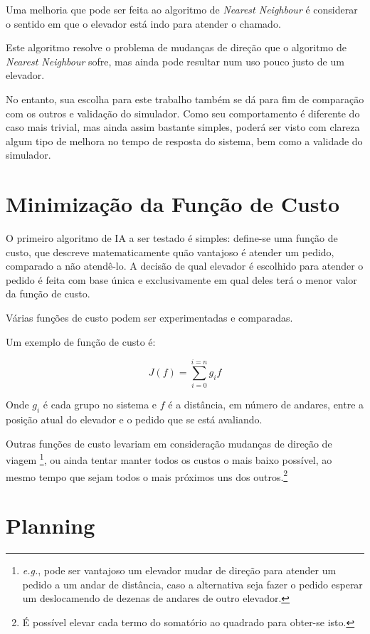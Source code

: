 Uma melhoria que pode ser feita ao algoritmo de \textit{Nearest Neighbour}
é considerar o sentido em que o elevador está indo para atender o chamado.

Este algoritmo resolve o problema de mudanças de direção que o algoritmo de
\textit{Nearest Neighbour} sofre, mas ainda pode resultar num uso pouco justo de
um elevador. %

No entanto, sua escolha para este trabalho também se dá para fim de comparação
com os outros e validação do simulador. Como seu comportamento é diferente do
caso mais trivial, mas ainda assim bastante simples, poderá ser visto com clareza
algum tipo de melhora no tempo de resposta do sistema, bem como a validade do simulador.

\section{\label{sec:ai:minimize-cost-function}Minimização da Função de Custo}

O primeiro algoritmo de IA a ser testado é simples: define-se uma
função de custo, que descreve matematicamente quão vantajoso é atender um
pedido, comparado a não atendê-lo. A decisão de qual elevador é escolhido para
atender o pedido é feita com base única e exclusivamente em qual deles terá o
menor valor da função de custo.

Várias funções de custo podem ser experimentadas e comparadas.

Um exemplo de função de custo é:

\[
  J(f) = \sum_{i=0}^{i=n} g_{i}f
\]

Onde $g_{i}$ é cada grupo no sistema e $f$ é a distância, em número de andares,
entre a posição atual do elevador e o pedido que se está avaliando.

Outras funções de custo levariam em consideração mudanças de direção de viagem
\footnote{\textit{e.g.}, pode ser vantajoso um elevador mudar de direção para atender um
pedido a um andar de distância, caso a alternativa seja fazer o pedido esperar
um deslocamendo de dezenas de andares de outro elevador.}, ou ainda tentar
manter todos os custos o mais baixo possível, ao mesmo tempo que sejam todos o
mais próximos uns dos outros.\footnote{É possível elevar cada termo do somatório ao
  quadrado para obter-se isto.}


\section{Planning}

